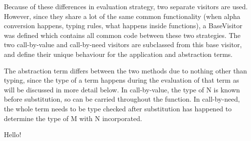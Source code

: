 \documentclass[a4paper,12pt]{report}
\begin{document}
Because of these differences in evaluation strategy, two separate visitors are used. However, since they share a lot of the same common functionality (when alpha conversion happens, typing rules, what happens inside functions), a BaseVisitor was defined which contains all common code between these two strategies. The two call-by-value and call-by-need visitors are subclassed from this base visitor, and define their unique behaviour for the application and abstraction terms.

The abstraction term differs between the two methods due to nothing other than typing, since the type of a term happens during the evaluation of that term as will be discussed in more detail below. In call-by-value, the type of N is known before substitution, so can be carried throughout the function. In call-by-need, the whole term needs to be type checked after substitution has happened to determine the type of M with N incorporated. 



\newpage
Hello! \cite{CourseSpecification}
\cite{Tarau2017}
\cite{Acar2008}
\cite{Barendregt2000}
\cite{Bird2009}
\cite{Alonzo1936}
\cite{Gay2019}
\cite{Everett2019}
\cite{Hankin2004}
\cite{Horowitz2013}
\cite{Kamareddine2000}
\cite{Loader1998}
\cite{Parr2012}
\cite{Pierce2002}
\cite{Rojas1998}
\cite{Scott2016}
\cite{Selinger2013}
\cite{Slonneger1995}
\cite{Sookocheff2018Eta}
\cite{Sookocheff2018Evaluation}
\cite{Tomassetti2007}
\cite{Srivastav2017}

\printbibliography
\end{document}

